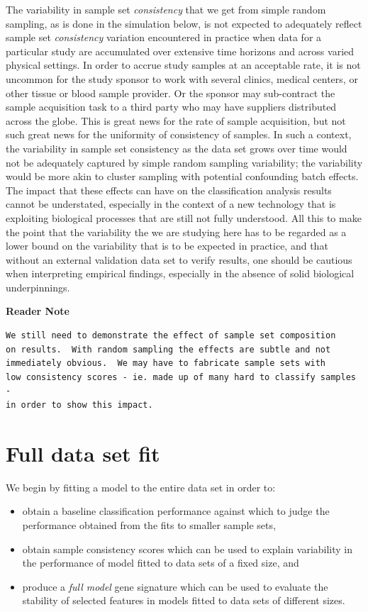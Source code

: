 \documentclass[
]{book}
\begin{document}
The variability in sample set \emph{consistency} that we get from simple random sampling,
as is done in the simulation below, is not expected to adequately reflect
sample set \emph{consistency} variation encountered in practice when data for a particular
study are accumulated over extensive time horizons and across varied
physical settings. In order to accrue study samples at an acceptable rate,
it is not uncommon for the study sponsor to work with several clinics, medical centers,
or other tissue or blood sample provider.
Or the sponsor may sub-contract the sample acquisition
task to a third party who may have suppliers distributed across the globe. This
is great news for the rate of sample acquisition, but not such great news for
the uniformity of consistency of samples. In such a context, the variability
in sample set consistency as the data set grows over time would not
be adequately captured by simple random sampling variability;
the variability would be more akin to cluster sampling with potential confounding
batch effects. The impact that these effects can have on the classification analysis
results cannot be understated, especially in the context of a new technology that
is exploiting biological processes that are still not fully understood. All this
to make the point that the variability the we are studying here has to be regarded
as a lower bound on the variability that is to be expected in practice, and that without
an external validation data set to verify results, one should be cautious
when interpreting empirical findings, especially in the absence of solid
biological underpinnings.

\textbf{Reader Note}

\begin{verbatim}
We still need to demonstrate the effect of sample set composition
on results.  With random sampling the effects are subtle and not
immediately obvious.  We may have to fabricate sample sets with 
low consistency scores - ie. made up of many hard to classify samples -
in order to show this impact.
\end{verbatim}

\hypertarget{full-data-set-fit}{%
\section{Full data set fit}\label{full-data-set-fit}}

We begin by fitting a model to the entire data set in order to:

\begin{itemize}
\item
  obtain a baseline classification performance against which to judge the performance
  obtained from the fits to smaller sample sets,
\item
  obtain sample consistency scores which can be used to explain variability
  in the performance of model fitted to data sets of a fixed size, and
\item
  produce a \emph{full model} gene signature which can be used to evaluate
  the stability of selected features in models fitted to data sets of different
  sizes.
\end{itemize}
\end{document}
